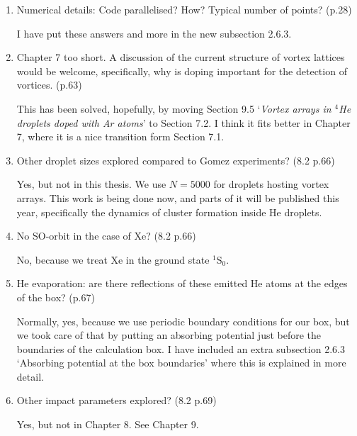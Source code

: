\documentclass[11pt]{revtex4-1}
\newenvironment{QandA}{\begin{enumerate}[label=\bfseries\arabic*)]\bfseries}
                      {\end{enumerate}}
\newenvironment{answered}{\par\normalfont}{}
\begin{document}
\begin{QandA}
		\item Numerical details: Code parallelised? How? Typical number of points? (p.28)
		\begin{answered}
			I have put these answers and more in the new subsection 2.6.3.
		\end{answered}
		
		\item Chapter 7 too short. A discussion of the current structure of vortex lattices would be welcome, specifically, why is doping important for the detection of vortices. (p.63)
		\begin{answered}
			This has been solved, hopefully, by moving Section 9.5 `\textit{Vortex arrays in $^4$He droplets doped with Ar atoms}' to Section 7.2. I think it fits better in Chapter 7, where it is a nice transition form Section 7.1.
		\end{answered}
		
		\item Other droplet sizes explored compared to Gomez experiments? (8.2 p.66)
		\begin{answered}
			Yes, but not in this thesis. We use $N=5000$ for droplets hosting vortex arrays. This work is being done now, and parts of it will be published this year, specifically the dynamics of cluster formation inside He droplets.
		\end{answered}
		
		\item No SO-orbit in the case of Xe? (8.2 p.66)
		\begin{answered}
			No, because we treat Xe in the ground state $^1$S$_0$.
		\end{answered}
		
		\item He evaporation: are there reflections of these emitted He atoms at the edges of the box? (p.67)
		\begin{answered}
			Normally, yes, because we use periodic boundary conditions for our box, but we took care of that by putting an absorbing potential just before the boundaries of the calculation box. I have included an extra subsection 2.6.3 `Absorbing potential at the box boundaries' where this is explained in more detail.
		\end{answered}
		
		\item Other impact parameters explored? (8.2 p.69)
		\begin{answered}
			Yes, but not in Chapter 8. See Chapter 9.
		\end{answered}
		

\end{QandA}
\end{document}
